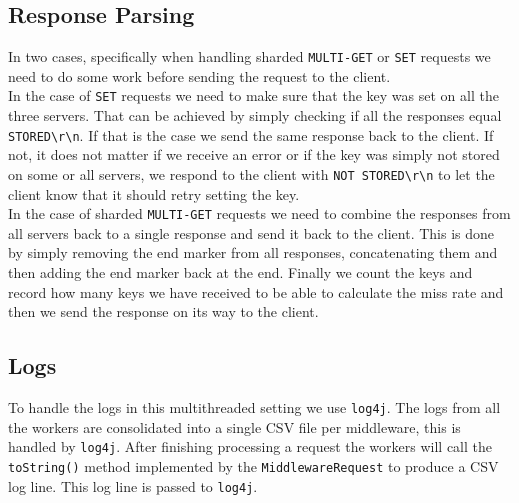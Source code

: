 \documentclass[11pt,a4paper]{article}
\newcommand*{\escape}[1]{\texttt{\textbackslash#1}}
\begin{document}
\subsection{Response Parsing}
%
In two cases, specifically when handling sharded \texttt{MULTI-GET} or \texttt{SET} requests we need to do some work before sending the request to the client.
%
\\
%
In the case of \texttt{SET} requests we need to make sure that the key was set on all the three servers.
%
That can be achieved by simply checking if all the responses equal \texttt{STORED\escape{r}\escape{n}}.
%
If that is the case we send the same response back to the client.
%
If not, it does not matter if we receive an error or if the key was simply not stored on some or all servers, we respond to the client with \texttt{NOT STORED\escape{r}\escape{n}} to let the client know that it should retry setting the key.
%
\\
%
In the case of sharded \texttt{MULTI-GET} requests we need to combine the responses from all servers back to a single response and send it back to the client.
%
This is done by simply removing the end marker from all responses, concatenating them and then adding the end marker back at the end.
%
Finally we count the keys and record how many keys we have received to be able to calculate the miss rate and then we send the response on its way to the client.
%
\subsection{Logs}
%
To handle the logs in this multithreaded setting we use \texttt{log4j}.
%
The logs from all the workers are consolidated into a single CSV file per middleware, this is handled by \texttt{log4j}.
%
After finishing processing a request the workers will call the \texttt{toString()} method implemented by the \texttt{MiddlewareRequest} to produce a CSV log line.
%
This log line is passed to \texttt{log4j}.
%
\end{document}
